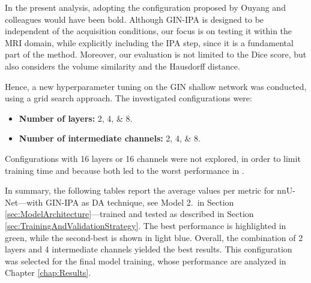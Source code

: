 In the present analysis, adopting the configuration proposed by Ouyang and colleagues would have been bold. Although GIN-IPA is designed to be independent of the acquisition conditions, our focus is on testing it within the MRI domain, while explicitly including the IPA step, since it is a fundamental part of the method. Moreover, our evaluation is not limited to the Dice score, but also considers the volume similarity and the Hausdorff distance.

Hence, a new hyperparameter tuning on the GIN shallow network was conducted, using a grid search approach. The investigated configurations were:
\begin{itemize}
    \item \textbf{Number of layers:} \numlist[list-final-separator = {, }]{2;4;8}.
    \item \textbf{Number of intermediate channels:} \numlist[list-final-separator = {, }]{2;4;8}.
\end{itemize}
Configurations with \num{16} layers or \num{16} channels were not explored, in order to limit training time and because both led to the worst performance in \cite{Ouyang2023}.

In summary, the following tables report the average values per metric for nnU-Net---with GIN-IPA as DA technique, see Model 2.\ in Section \ref{sec:ModelArchitecture}---trained and tested as described in Section\,\ref{sec:TrainingAndValidationStrategy}. The best performance is highlighted in green, while the second-best is shown in light blue. Overall, the combination of \num{2} layers and \num{4} intermediate channels yielded the best results. This configuration was selected for the final model training, whose performance are analyzed in Chapter \ref{chap:Results}.

